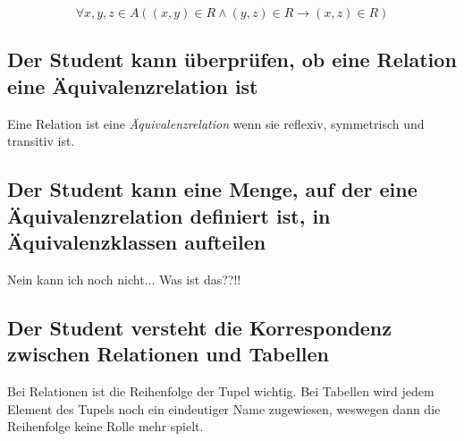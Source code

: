 \begin{equation*}
  \forall x,y,z \in A ((x,y) \in R \wedge (y,z) \in R \to (x,z) \in R)
\end{equation*}


\subsection{Der Student kann überprüfen, ob eine Relation eine Äquivalenzrelation ist}
Eine Relation ist eine \emph{Äquivalenzrelation} wenn sie reflexiv, symmetrisch und transitiv ist.

\subsection{Der Student kann eine Menge, auf der eine Äquivalenzrelation definiert ist, in Äquivalenzklassen aufteilen}



Nein kann ich noch nicht... Was ist das??!!
\subsection{Der Student versteht die Korrespondenz zwischen Relationen und Tabellen}

Bei Relationen ist die Reihenfolge der Tupel wichtig. Bei Tabellen wird jedem Element des Tupels noch ein eindeutiger Name zugewiesen, weswegen dann die Reihenfolge keine Rolle mehr spielt.